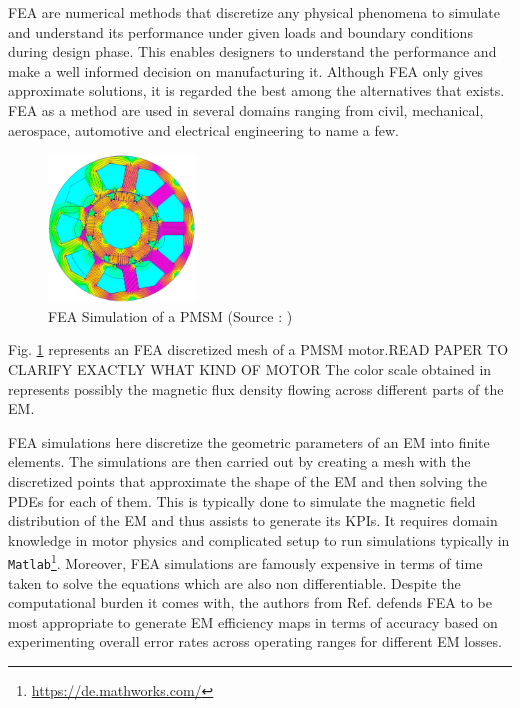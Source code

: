 \documentclass{report} %
\begin{document}
\ac{FEA} are numerical methods that discretize any physical phenomena to simulate and understand its performance under given loads and boundary conditions during design 
phase. This enables designers to understand the performance and make a well informed decision on manufacturing it. Although \ac{FEA} only gives approximate solutions, 
it is regarded the best among the alternatives that exists.
\ac{FEA} as a method are used in several domains ranging from civil, mechanical, aerospace, automotive and electrical engineering to name a few.

\begin{figure}[H]
    \centering
    \includegraphics[width=0.35\textwidth]{./ReportImages/FEA.png} 
    \caption{\ac{FEA} Simulation of a \ac{PMSM} (Source : \cite{CNNFEA-2020})}
    \label{fig:FEA Simulation of a PMSM}
\end{figure}

Fig. \ref{fig:FEA Simulation of a PMSM} represents an \ac{FEA} discretized mesh of a \ac{PMSM} motor.READ PAPER TO CLARIFY EXACTLY WHAT KIND OF MOTOR
The color scale obtained in  represents possibly the magnetic flux density flowing across different parts of the \ac{EM}.

\ac{FEA} simulations here discretize the geometric parameters of an \ac{EM} into finite elements.
The simulations are then carried out by creating a mesh with the discretized points that approximate the shape of the \ac{EM} and then solving the \ac{PDE}s for each of them.
This is typically done to simulate the magnetic field distribution of the \ac{EM} and thus assists to generate its \ac{KPI}s.  
It requires domain knowledge in motor physics and complicated setup to run simulations typically in \texttt{Matlab}\footnote{\url{https://de.mathworks.com/}}.
Moreover, \ac{FEA} simulations are famously expensive in terms of time taken to solve the equations which are also non differentiable.
Despite the computational burden it comes with, the authors from Ref. \cite{FEA-ETA-2017} defends \ac{FEA} to be most appropriate to 
generate \ac{EM} efficiency maps in terms of accuracy based on experimenting overall error rates across operating ranges for different \ac{EM} losses.\\
\end{document}
